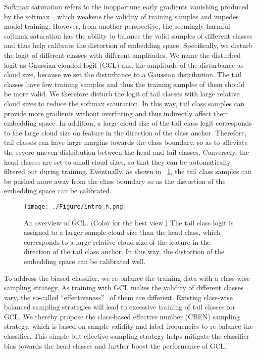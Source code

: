 \documentclass[10pt,twocolumn,letterpaper]{article}
\begin{document}
Softmax saturation refers to the inopportune early gradients vanishing produced by the softmax~\cite{Chen2017CVPR, Zhang2021class}, which weakens the validity of training samples and impedes model training. However, from another perspective, the seemingly harmful softmax saturation has the ability to balance the valid samples of different classes and thus help calibrate the distortion of embedding space. Specifically, we disturb the logit of different classes with different amplitudes. We name the disturbed logit as Gaussian clouded logit (GCL) and the amplitude of the disturbance as cloud size, because we set the disturbance to a Gaussian distribution. The tail classes have few training samples and thus the training samples of them should be more valid. We therefore disturb the logit of tail classes with large relative cloud sizes to reduce the softmax saturation. In this way, tail class samples can provide more gradients without overfitting and thus indirectly affect their embedding space. In addition, a large cloud size of the tail class logit corresponds to the large cloud size on feature in the direction of the class anchor. Therefore, tail classes can have large margins towards the class boundary, so as to alleviate the severe uneven distribution between the head and tail classes. Conversely, the head classes are set to small cloud sizes, so that they can be automatically filtered out during training. Eventually, as shown in ~\cref{fig:intro}, the tail class samples can be pushed more away from the class boundary so as the distortion of the embedding space can be calibrated.

\begin{figure}[t]
\centering
 \texttt{[image: ./Figure/intro\_h.png]}
 \caption{An overview of GCL. (Color for the best view.) The tail class logit is assigned to a larger sample cloud size than the head class, which corresponds to a large relative cloud size of the feature in the direction of the tail class anchor. In this way, the distortion of the embedding space can be calibrated well.}
 \label{fig:intro}
 \vspace{-6pt}
\end{figure}

To address the biased classifier, we re-balance the training data with a class-wise sampling strategy. As training with GCL makes the validity of different classes vary, the so-called ``effectiveness''~\cite{cui2019class} of them are different. Existing class-wise balanced sampling strategies will lead to excessive training of tail classes for GCL. We thereby propose the class-based effective number (CBEN) sampling strategy, which is based on sample validity and label frequencies to re-balance the classifier. This simple but effective sampling strategy helps mitigate the classifier bias towards the head classes and further boost the performance of GCL.
\end{document}

